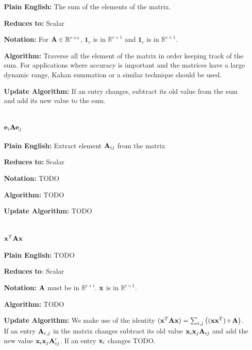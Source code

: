 \textbf{Plain English:} The sum of the elements of the matrix.

\textbf{Reduces to:} Scalar

\textbf{Notation:} For $\mathbf{A} \in \mathbb{R}^{r\times c}$, $\mathbf{1}_r$ is in $\mathbb{R}^{r \times 1}$ and $\mathbf{1}_c$ is in $\mathbb{R}^{c \times 1}$.

\textbf{Algorithm:} Traverse all the element of the matrix in order keeping track of the sum. For applications where accuracy is important and the matrices have a large dynamic range, Kahan summation or a similar technique should be used.

\textbf{Update Algorithm:} If an entry changes, subtract its old value from the sum and add its new value to the sum.

\section{$\mathbf{e}_i \mathbf{A} \mathbf{e}_j$}

\textbf{Plain English:} Extract element $\mathbf{A}_{ij}$ from the matrix

\textbf{Reduces to:} Scalar

\textbf{Notation:} TODO

\textbf{Algorithm:} TODO

\textbf{Update Algorithm:} TODO


\section{$\mathbf{x}^T \mathbf{A} \mathbf{x}$}

\textbf{Plain English:} TODO

\textbf{Reduces to}: Scalar

\textbf{Notation:} $\mathbf{A}$ must be in $\mathbb{R}^{i\times i}$. $\mathbf{x}$ is in $\mathbb{R}^{i \times 1}$.

\textbf{Algorithm:} TODO

\textbf{Update Algorithm:} We make use of the identity $(\mathbf{x}^T \mathbf{A} \mathbf{x})=\sum_{i,j}\big((\mathbf{x} \mathbf{x}^T)\circ\mathbf{A}\big)$. If an entry $\mathbf{A}_{i,j}$ in the matrix changes subtract its old value $\mathbf{x}_i \mathbf{x}_j \mathbf{A}_{ij}$ and add the new value $\mathbf{x}_i \mathbf{x}_j \mathbf{A}_{ij}'$. If an entry $\mathbf{x}_i$ changes TODO.
